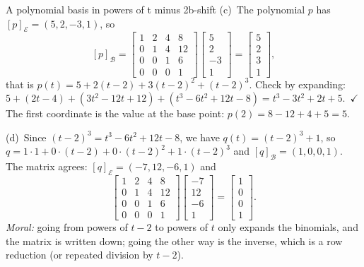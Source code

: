 \documentclass[11pt]{article}
\begin{document}
\begin{exmp}{A polynomial basis in powers of t minus 2}{b-shift}
(c)~The polynomial $p$ has $[p]_{\mathcal{E}}=(5,2,-3,1)$, so
\[
[p]_{\mathcal{B}}=\begin{bmatrix}1&2&4&8\\0&1&4&12\\0&0&1&6\\0&0&0&1\end{bmatrix}\begin{bmatrix}5\\2\\-3\\1\end{bmatrix}=\begin{bmatrix}5\\2\\3\\1\end{bmatrix},
\]
that is $p(t)=5+2(t-2)+3(t-2)^2+(t-2)^3$. Check by expanding: $5+(2t-4)+(3t^2-12t+12)+(t^3-6t^2+12t-8)=t^3-3t^2+2t+5$.\ $\checkmark$ The first coordinate is the value at the base point: $p(2)=8-12+4+5=5$.

(d)~Since $(t-2)^3=t^3-6t^2+12t-8$, we have $q(t)=(t-2)^3+1$, so $q=1\cdot1+0\cdot(t-2)+0\cdot(t-2)^2+1\cdot(t-2)^3$ and $[q]_{\mathcal{B}}=(1,0,0,1)$. The matrix agrees: $[q]_{\mathcal{E}}=(-7,12,-6,1)$ and
\[
\begin{bmatrix}1&2&4&8\\0&1&4&12\\0&0&1&6\\0&0&0&1\end{bmatrix}\begin{bmatrix}-7\\12\\-6\\1\end{bmatrix}=\begin{bmatrix}1\\0\\0\\1\end{bmatrix}.
\]
\emph{Moral:} going from powers of $t-2$ to powers of $t$ only expands the binomials, and the matrix is written down; going the other way is the inverse, which is a row reduction (or repeated division by $t-2$).
\end{exmp}
\end{document}
